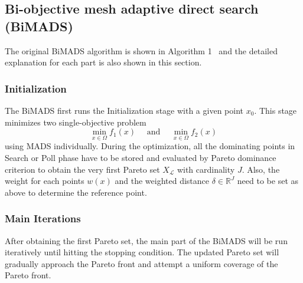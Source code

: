 \documentclass[11pt,oneside,onecolumn,openright]{article}
\begin{document}
  \subsection{Bi-objective mesh adaptive direct search (BiMADS)}
    The original BiMADS algorithm is shown in Algorithm 1~\cite{audet2008multiobjective} and the detailed explanation for each part is also shown in this section.
    \subsubsection{Initialization}
    The BiMADS first runs the Initialization stage with a given point $x_0$. This stage minimizes two single-objective problem
    \begin{equation}
    \min _{x \in \Omega} f_{1}(x) \quad \text { and } \quad \min _{x \in \Omega} f_{2}(x)
    \end{equation}
    using MADS individually. During the optimization, all the dominating points in Search or Poll phase have to be stored and evaluated by Pareto dominance criterion to obtain the very first Pareto set $X_\mathcal{L}$ with cardinality $J$. Also, the weight for each points $w(x)$ and the weighted distance $\delta\in \mathbb{R}^J$ need to be set as above to determine the reference point.

    \subsubsection{Main Iterations}
    After obtaining the first Pareto set, the main part of the BiMADS will be run iteratively until hitting the stopping condition. The updated Pareto set will gradually approach the Pareto front and attempt a uniform coverage of the Pareto front.
\end{document}
